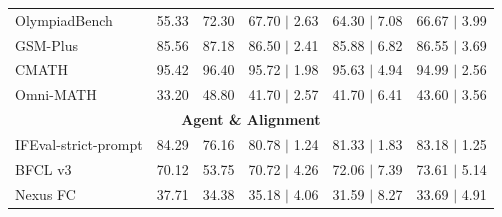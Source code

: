 \begin{table}[htbp]
{\begin{tabular}{lcc|ccc}
OlympiadBench & 55.33 & 72.30 & 67.70 $\mid$ 2.63 & 64.30 $\mid$ 7.08 &  66.67 $\mid$ 3.99 \\
GSM-Plus & 85.56 & 87.18 & 86.50 $\mid$ 2.41 & 85.88 $\mid$ 6.82 &  86.55 $\mid$ 3.69 \\
CMATH & 95.42 & 96.40 & 95.72 $\mid$ 1.98 & 95.63 $\mid$ 4.94 &  94.99 $\mid$ 2.56 \\
Omni-MATH & 33.20 & 48.80 & 41.70 $\mid$ 2.57 & 41.70 $\mid$ 6.41 &  43.60 $\mid$ 3.56 \\
\midrule
\multicolumn{6}{c}{\textbf{Agent \& Alignment}} \\
\midrule
IFEval-strict-prompt & 84.29 & 76.16 & 80.78 $\mid$ 1.24 & 81.33 $\mid$ 1.83 &  83.18 $\mid$ 1.25 \\
BFCL v3 & 70.12 & 53.75 & 70.72 $\mid$ 4.26 & 72.06 $\mid$ 7.39 &  73.61 $\mid$ 5.14 \\
Nexus FC & 37.71 & 34.38 & 35.18 $\mid$ 4.06 & 31.59 $\mid$ 8.27 &  33.69 $\mid$ 4.91 \\
\bottomrule
\end{tabular}%
}
\end{table}
